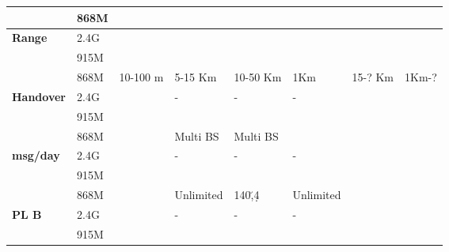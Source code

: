 \begin{longtable}{l|l|l|l|l|l|l|l}
	\                                    & 868M             &              &                        &               &                                        &                   & \\\hline
	\bf{Range}                           & 2.4G             &              &                        &               &                                        &                   & \\
	\                                    & 915M             &              &                        &               &                                        &                   & \\
	\                                    & 868M             & 10-100 m     & 5-15 Km                & 10-50	Km      & 1Km                                    & 15-? Km           & 1Km-?           \\\hline
	\bf{Handover}                        & 2.4G             & \ko          & -                      & -             & -                                      & \ko               & \ko             \\
	\                                    & 915M             & \ko          & \ko                    & \ko           & \ko                                    & \ko               & \ko             \\
	\                                    & 868M             & \ko          & Multi \ac{BS}          & Multi	\ac{BS} & \ko                                    & \ko               & \ko             \\\hline
	\bf{msg/day}                         & 2.4G             & \ko          & -                      & -             & -                                      & \ko               & \ko             \\
	\                                    & 915M             & \ko          & \ko                    & \ko           & \ko                                    & \ko               & \ko             \\
	\                                    & 868M             & \ko          & Unlimited              & 140\u,4\d     & Unlimited                              & \ko               & \ko             \\\hline
	\bf{\ac{PL}	B}                       & 2.4G             & \ko          & -                      & -             & -                                      & \ko               & \ko             \\
	\                                    & 915M             & \ko          & \ko                    & \ko           & \ko                                    & \ko               & \ko             \\

\end{longtable}
